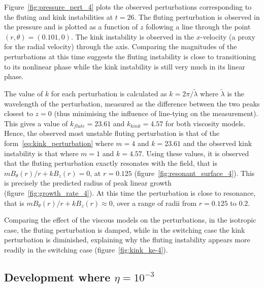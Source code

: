 \documentclass[12pt]{article}
\begin{document}
Figure~\ref{fig:pressure_pert_4} plots the observed perturbations corresponding to the fluting and kink instabilities at $t=26$. The fluting perturbation is observed in the pressure and is plotted as a function of $z$ following a line through the point $(r, \theta) = (0.101, 0)$. The kink instability is observed in the $x$-velocity (a proxy for the radial velocity) through the axis. Comparing the magnitudes of the perturbations at this time suggests the fluting instability is close to transitioning to its nonlinear phase while the kink instability is still very much in its linear phase.

The value of $k$ for each perturbation is calculated as $k = 2\pi/\tilde{\lambda}$ where $\tilde{\lambda}$ is the wavelength of the perturbation, measured as the difference between the two peaks closest to $z=0$ (thus minimising the influence of line-tying on the measurement). This gives a value of $k_{flute}=23.61$ and $k_{kink}=4.57$ for both viscosity models. Hence, the observed most unstable fluting perturbation is that of the form~\eqref{eq:kink_perturbation} where $m=4$ and $k=23.61$ and the observed kink instability is that where $m=1$ and $k=4.57$. Using these values, it is observed that the fluting perturbation exactly resonates with the field, that is $m B_{\theta}(r)/r + kB_z(r) = 0$, at $r=0.125$ (figure~\ref{fig:resonant_surface_4}). This is precisely the predicted radius of peak linear growth (figure~\ref{fig:growth_rate_4}). At this time the perturbation is close to resonance, that is $m B_{\theta}(r)/r + kB_z(r) \approx 0$, over a range of radii from $r=0.125$ to $0.2$.

Comparing the effect of the viscous models on the perturbations, in the isotropic case, the fluting perturbation is damped, while in the switching case the kink perturbation is diminished, explaining why the fluting instability appears more readily in the switching case (figure~\ref{fig:kink_ke-4}).

\subsection{Development where $\eta=10^{-3}$}
\end{document}
